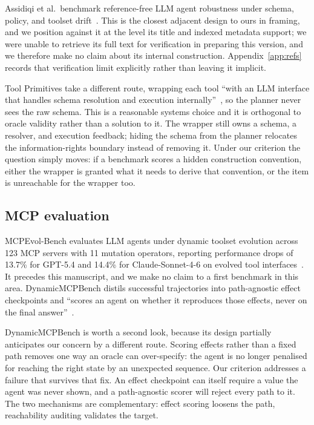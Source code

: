 \documentclass[11pt]{article}
\begin{document}
Assidiqi et al.\ benchmark reference-free LLM agent robustness under schema,
policy, and toolset drift~\cite{assidiqi2026referencefree}. This is the
closest adjacent design to ours in framing, and we position against it at the
level its title and indexed metadata support; we were unable to retrieve its
full text for verification in preparing this version, and we therefore make
no claim about its internal construction. Appendix~\ref{app:refs} records
that verification limit explicitly rather than leaving it implicit.

Tool Primitives take a different route, wrapping each tool ``with an LLM
interface that handles schema resolution and execution
internally''~\cite{jin2026toolprimitives}, so the planner never sees the raw
schema. This is a reasonable systems choice and it is orthogonal to oracle
validity rather than a solution to it. The wrapper still owns a schema, a
resolver, and execution feedback; hiding the schema from the planner
relocates the information-rights boundary instead of removing it. Under our
criterion the question simply moves: if a benchmark scores a hidden
construction convention, either the wrapper is granted what it needs to derive
that convention, or the item is unreachable for the wrapper too.

\subsection{MCP evaluation}

MCPEvol-Bench evaluates LLM agents under dynamic toolset evolution across 123
MCP servers with 11 mutation operators, reporting performance drops of 13.7\%
for GPT-5.4 and 14.4\% for Claude-Sonnet-4-6 on evolved tool
interfaces~\cite{liu2026mcpevol}. It precedes this manuscript, and we make no
claim to a first benchmark in this area. DynamicMCPBench distils successful
trajectories into path-agnostic effect checkpoints and ``scores an agent on
whether it reproduces those effects, never on the final
answer''~\cite{kaminski2026dynamicmcpbench}.

DynamicMCPBench is worth a second look, because its design partially
anticipates our concern by a different route. Scoring effects rather than a
fixed path removes one way an oracle can over-specify: the agent is no longer
penalised for reaching the right state by an unexpected sequence. Our
criterion addresses a failure that survives that fix. An effect checkpoint can
itself require a value the agent was never shown, and a path-agnostic scorer
will reject every path to it. The two mechanisms are complementary: effect
scoring loosens the path, reachability auditing validates the target.
\end{document}
